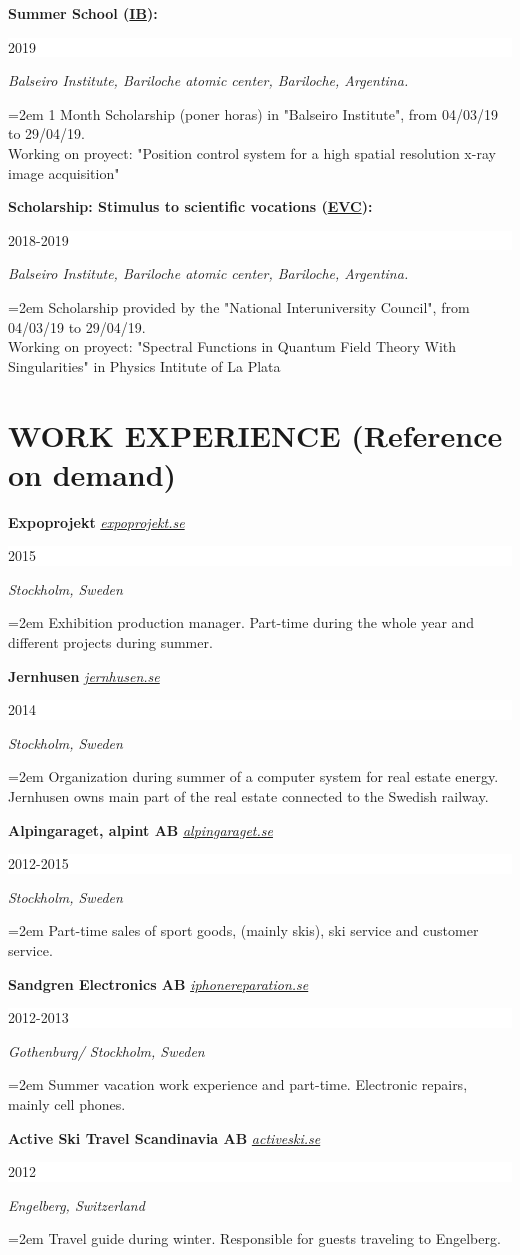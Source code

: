 \documentclass[paper=letter,fontsize=11pt]{scrartcl} %
\newcommand{\sepspace}{\vspace*{1em}}		%
\newcommand{\NewPart}[2]{\section*{\uppercase{#1} \small \normalfont #2}}
\newcommand{\EducationEntry}[4]{
		\noindent \textbf{#1} \hfill      %
		\colorbox{White}{%
			\parbox{6em}{%
			\hfill\color{Black}#2}} \par  %
		\noindent \textit{#3} \par        %
		\noindent\hangindent=2em\hangafter=0 \small #4 %
		\normalsize \par}
\newcommand{\WorkEntry}[5]{
		\noindent \textbf{#1}
        \noindent \small \textit{#2}
        \hfill      %
        \colorbox{White}{%
			\parbox{6em}{%
			\hfill\color{Black}#3}} \par  %
		\noindent \textit{#4} \par        %
		\noindent\hangindent=2em\hangafter=0 \small #5 %
		\normalsize \par}
\begin{document}
\sepspace

\EducationEntry{Summer School ({\href{http://www.ib.edu.ar/component/k2/item/452-becas-de-verano.html}{IB}}):}
{2019}
{Balseiro Institute, Bariloche atomic center, Bariloche, Argentina.}
{1 Month Scholarship (poner horas) in "Balseiro Institute", from 04/03/19 to 29/04/19. \\ 
Working on proyect: "Position control system for a high spatial resolution x-ray image acquisition"
}

\sepspace

\EducationEntry{Scholarship: Stimulus to scientific vocations ({\href{http://evc.cin.edu.ar/}{EVC}}):}
{2018-2019}
{Balseiro Institute, Bariloche atomic center, Bariloche, Argentina.}
{Scholarship provided by the "National Interuniversity Council", from 04/03/19 to 29/04/19. \\ 
Working on proyect: "Spectral Functions in Quantum Field Theory With Singularities" in Physics Intitute of La Plata
}


\NewPart{Work Experience}{(Reference on demand)}

\WorkEntry{Expoprojekt}{\href{http://expoprojekt.se}{expoprojekt.se}}{2015}{Stockholm, Sweden}{Exhibition production manager. Part-time during the whole year and different projects during summer.}

\sepspace

\WorkEntry{Jernhusen}{\href{http://jernhusen.se}{jernhusen.se}}{2014}{Stockholm, Sweden}{Organization during summer of a computer system for real estate energy. Jernhusen owns main part of the real estate connected to the Swedish railway.}

\sepspace

\WorkEntry{Alpingaraget, alpint AB}{\href{http://alpingaraget.se}{alpingaraget.se}}{2012-2015}{Stockholm, Sweden}{Part-time sales of sport goods, (mainly skis), ski service and customer service.}
\newpage

\WorkEntry{Sandgren Electronics AB}{\href{http://iphonereparation.se}{iphonereparation.se}}{2012-2013}{Gothenburg/ Stockholm, Sweden}{Summer vacation work experience and part-time. Electronic repairs, mainly cell phones.}

\sepspace

\WorkEntry{Active Ski Travel Scandinavia AB}{\href{http://www.activeski.se}{activeski.se}}{2012}{Engelberg, Switzerland}{Travel guide during winter. Responsible for guests traveling to Engelberg.}
\end{document}
